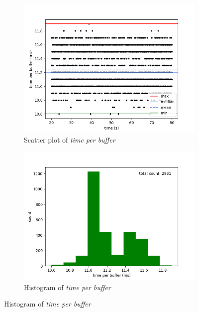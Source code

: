 \begin{figure}[H]
    \centering

    \begin{subfigure}[t]{0.5\textwidth}
        \centering
        \includegraphics[scale=0.45]{img/synthetic_read_writes_no_wait_per_buffer_scatter.png}
        \caption{Scatter plot of \textit{time per buffer}}
    \end{subfigure}%
    \begin{subfigure}[t]{0.5\textwidth}
        \centering
        \includegraphics[scale=0.45]{img/synthetic_read_writes_no_wait_per_buffer_hist.png}
        \caption{Histogram of \textit{time per buffer}}
    \end{subfigure}


\end{figure}
